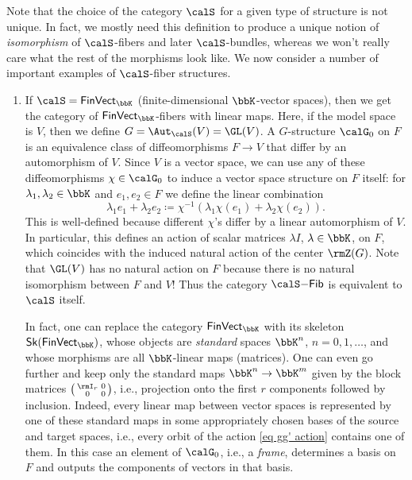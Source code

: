 Note that the choice of the category $\calS$ for a given type of structure is not unique. In fact, we mostly need this definition to produce a unique notion of \emph{isomorphism} of $\calS$-fibers and later $\calS$-bundles, whereas we won't really care what the rest of the morphisms look like. We now consider a number of important examples of $\calS$-fiber structures.
\begin{example}\label{ex linear G-structures}
    \begin{enumerate}
        \item If $\calS=\mathsf{FinVect}_\bbK$ (finite-dimensional $\bbK$-vector spaces), then we get the category of $\mathsf{FinVect}_\bbK$-fibers with linear maps. Here, if the model space is $V$, then we define $G=\Aut_\calS(V)=\GL(V)$. A $G$-structure $\calG_0$ on $F$ is an equivalence class of diffeomorphisms $F\to V$ that differ by an automorphism of $V$. Since $V$ is a vector space, we can use any of these diffeomorphisms $\chi\in\calG_0$ to induce a vector space structure on $F$ itself: for $\lambda_1,\lambda_2\in\bbK$ and $e_1,e_2\in F$ we define the linear combination
        \[\lambda_1e_1+\lambda_2 e_2\coloneqq \chi^{-1}(\lambda_1\chi(e_1)+\lambda_2\chi(e_2)).\]
        This is well-defined because different $\chi$'s differ by a linear automorphism of $V$. In particular, this defines an action of scalar matrices $\lambda I$, $\lambda\in\bbK$, on $F$, which coincides with the induced natural action of the center $\rmZ(G)$. Note that $\GL(V)$ has no natural action on $F$ because there is no natural isomorphism between $F$ and $V$! Thus the category $\calS\mathsf{-Fib}$ is equivalent to $\calS$ itself.

        In fact, one can replace the category $\mathsf{FinVect}_\bbK$ with its skeleton $\mathsf{Sk}(\mathsf{FinVect}_\bbK)$, whose objects are \emph{standard} spaces $\bbK^n$, $n=0,1,\ldots$, and whose morphisms are all $\bbK$-linear maps (matrices). One can even go further and keep only the standard maps $\bbK^n\to\bbK^m$ given by the block matrices $\left(\begin{smallmatrix}\rmI_r&0\\0&0\end{smallmatrix}\right)$, i.e., projection onto the first $r$ components followed by inclusion. Indeed, every linear map between vector spaces is represented by one of these standard maps in some appropriately chosen bases of the source and target spaces, i.e., every orbit of the action \eqref{eq gg' action} contains one of them. In this case an element of $\calG_0$, i.e., a \emph{frame}, determines a basis on $F$ and outputs the components of vectors in that basis.
        

\end{enumerate}
\end{example}
